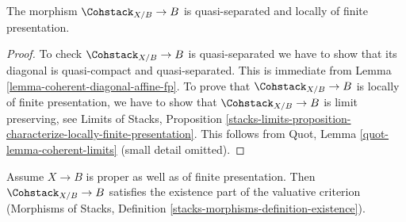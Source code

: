 \begin{lemma}
\label{lemma-coherent-qs-lfp}
The morphism $\Cohstack_{X/B} \to B$ is quasi-separated and
locally of finite presentation.
\end{lemma}

\begin{proof}
To check $\Cohstack_{X/B} \to B$ is quasi-separated we have to
show that its diagonal is quasi-compact and quasi-separated.
This is immediate from Lemma \ref{lemma-coherent-diagonal-affine-fp}.
To prove that $\Cohstack_{X/B} \to B$ is locally of finite
presentation, we have to show that $\Cohstack_{X/B} \to B$
is limit preserving, see
Limits of Stacks, Proposition
\ref{stacks-limits-proposition-characterize-locally-finite-presentation}.
This follows from Quot, Lemma \ref{quot-lemma-coherent-limits}
(small detail omitted).
\end{proof}

\begin{lemma}
\label{lemma-coherent-existence-part}
Assume $X \to B$ is proper as well as of finite presentation.
Then $\Cohstack_{X/B} \to B$ satisfies the existence part
of the valuative criterion (Morphisms of Stacks, Definition
\ref{stacks-morphisms-definition-existence}).
\end{lemma}

